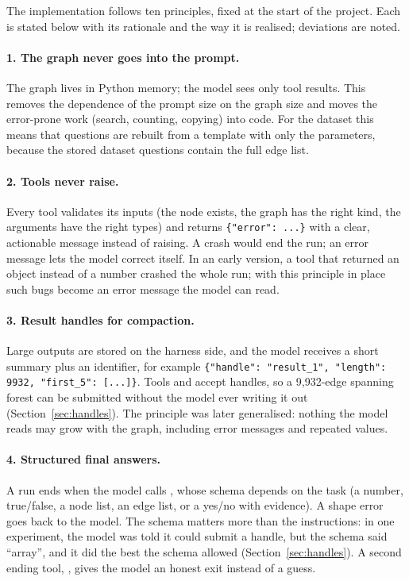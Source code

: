 The implementation follows ten principles, fixed at the start of the project. Each is stated below with its
rationale and the way it is realised; deviations are noted.

\paragraph{1. The graph never goes into the prompt.}
The graph lives in Python memory; the model sees only tool results. This removes the dependence of the prompt size on
the graph size and moves the error-prone work (search, counting, copying) into code. For the dataset this means that
questions are rebuilt from a template with only the parameters, because the stored dataset questions contain the full
edge list.

\paragraph{2. Tools never raise.}
Every tool validates its inputs (the node exists, the graph has the right kind, the arguments have the right types)
and returns \texttt{\{"error": ...\}} with a clear, actionable message instead of raising. A crash would end the run;
an error message lets the model correct itself. In an early version, a tool that returned an object instead of a
number crashed the whole run; with this principle in place such bugs become an error message the model can read.

\paragraph{3. Result handles for compaction.}
Large outputs are stored on the harness side, and the model receives a short summary plus an identifier, for example
\texttt{\{"handle": "result\_1", "length": 9932, "first\_5": [...]\}}. Tools and  accept handles, so a
9,932-edge spanning forest can be submitted without the model ever writing it out (Section~\ref{sec:handles}). The
principle was later generalised: nothing the model reads may grow with the graph, including error messages and
repeated values.

\paragraph{4. Structured final answers.}
A run ends when the model calls , whose schema depends on the task (a number, true/false, a node
list, an edge list, or a yes/no with evidence). A shape error goes back to the model. The schema matters more than the
instructions: in one experiment, the model was told it could submit a handle, but the schema said ``array'', and it
did the best the schema allowed (Section~\ref{sec:handles}). A second ending tool, , gives the
model an honest exit instead of a guess.

